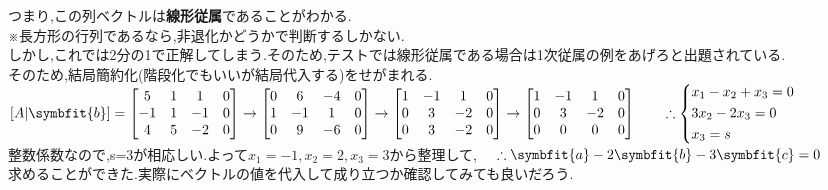 つまり,この列ベクトルは\textbf{線形従属}であることがわかる.\\
※長方形の行列であるなら,非退化かどうかで判断するしかない.\\
しかし,これでは2分の1で正解してしまう.そのため,テストでは線形従属である場合は1次従属の例をあげろと出題されている.\\
そのため,結局簡約化(階段化でもいいが結局代入する)をせがまれる.\\
$[A|\symbfit{b}]=
    \begin{bmatrix}
        5 & 1 & 1 & 0 \\
        -1 & 1 & -1 & 0 \\
        4 & 5 & -2 & 0 
    \end{bmatrix}\rightarrow
    \begin{bmatrix}
        0 & 6 & -4 & 0 \\
        1 & -1 & 1 & 0 \\
        0 & 9 & -6 & 0  
    \end{bmatrix}\rightarrow
    \begin{bmatrix}
        1 & -1 & 1 & 0 \\
        0 & 3 & -2 & 0 \\
        0 & 3 & -2 & 0
    \end{bmatrix}\rightarrow
    \begin{bmatrix}
        1 & -1 & 1 & 0 \\
        0 & 3 & -2 & 0 \\
        0 & 0 & 0 & 0   
    \end{bmatrix}\qquad
    \therefore 
    \begin{cases*}
    x_1 -x_2 + x_3 = 0 \\
    3x_2 -2x_3 = 0 \\
         x_3 = s 
    \end{cases*}$
    \vspace{1mm}\\整数係数なので,s=3が相応しい.よって$x_1=-1,x_2=2,x_3=3$から整理して,
    $\quad\therefore \symbfit{a}-2\symbfit{b}-3\symbfit{c}=0$
\medskip\\
求めることができた.実際にベクトルの値を代入して成り立つか確認してみても良いだろう.
